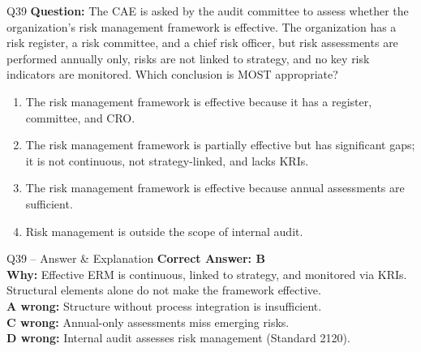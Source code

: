\documentclass[aspectratio=169,10pt]{beamer}
\begin{document}
	\begin{frame}[t]{Q39}
		\small
		\textbf{Question:} The CAE is asked by the audit committee to assess whether the organization's risk management framework is effective. The organization has a risk register, a risk committee, and a chief risk officer, but risk assessments are performed annually only, risks are not linked to strategy, and no key risk indicators are monitored. Which conclusion is MOST appropriate?
		\begin{enumerate}[label=\Alph*.,itemsep=1pt,topsep=2pt]
			\item The risk management framework is effective because it has a register, committee, and CRO.
			\item The risk management framework is partially effective but has significant gaps; it is not continuous, not strategy-linked, and lacks KRIs.
			\item The risk management framework is effective because annual assessments are sufficient.
			\item Risk management is outside the scope of internal audit.
		\end{enumerate}
	\end{frame}
	
	\begin{frame}[t]{Q39 -- Answer \& Explanation}
		\small
		\textbf{Correct Answer: B} \\[4pt]
		\textbf{Why:} Effective ERM is continuous, linked to strategy, and monitored via KRIs. Structural elements alone do not make the framework effective. \\[4pt]
		\textbf{A wrong:} Structure without process integration is insufficient. \\[2pt]
		\textbf{C wrong:} Annual-only assessments miss emerging risks. \\[2pt]
		\textbf{D wrong:} Internal audit assesses risk management (Standard 2120).
	\end{frame}
	
\end{document}

